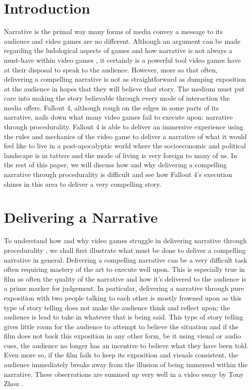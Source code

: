 \documentclass[12pt, conference]{IEEEtran}
\begin{document}
\section{Introduction}

Narrative is the primal way many forms of media convey a message to its audience and video games are no different. Although an argument can be made regarding the ludological aspects of games and how narrative is not always a must-have within video games \cite{murray}, it certainly is a powerful tool video games have at their disposal to speak to the audience. However, more so that often, delivering a compelling narrative is not as straightforward as dumping exposition at the audience in hopes that they will believe that story. The medium must put care into making the story believable through every mode of interaction the media offers. Fallout 4, although rough on the edges in some parts of its narrative, nails down what many video games fail to execute upon: narrative through procedurality. Fallout 4 is able to deliver an immersive experience using the rules and mechanics of the video game to deliver a narrative of what it would feel like to live in a post-apocalyptic world where the socioeconomic and political landscape is in tatters and the mode of living is very foreign to many of us. In the rest of this paper, we will discuss how and why delivering a compelling narrative through procedurality is difficult and see how Fallout 4's execution shines in this area to deliver a very compelling story.\\

\section{Delivering a Narrative}

To understand how and why video games struggle in delivering narrative through procedurality \cite{harper}, we shall first illustrate what must be done to deliver a compelling narrative in general. Delivering a compelling narrative can be a very difficult task often requiring mastery of the art to execute well upon. This is especially true in film as often the quality of the narrative and how it's delivered to the audience is a prime marker for judgement. In particular, delivering a narrative through pure exposition with two people talking to each other is mostly frowned upon as this type of story telling does not make the audience think and reflect upon; the audience is lead to take in whatever that is being said. This type of story telling gives little room for the audience to attempt to believe the situation and if the film does not back this exposition in any other form, be it using visual or audio cues, the audience no longer has an incentive to believe what they have been told. Even more so, if the film fails to keep its exposition and visuals consistent, the audience immediately breaks away from the illusion of being immersed within the narrative. These observations are summed up very well in a video essay by Tony Zhou \cite{everyframeapainting}.\\
\end{document}

